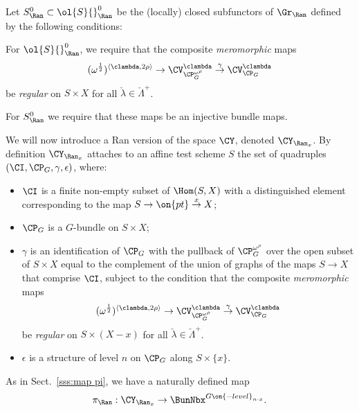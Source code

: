 \documentclass[9pt]{amsart}
\theoremstyle{definition}
\theoremstyle{remark}
\newcommand{\secref}[1]{Sect.~\ref{#1}}
\numberwithin{equation}{section}
\begin{document}
Let $S^0_\Ran\subset \ol{S}{}^0_\Ran$ be the (locally) closed subfunctors of $\Gr_\Ran$ defined by the following
conditions:

\medskip

For $\ol{S}{}^0_\Ran$, we require that the composite \emph{meromorphic}  maps
$$(\omega^{\frac{1}{2}})^{\langle \clambda,2\rho\rangle}\to \CV^{\clambda}_{\CP^{\omega^\rho}_G} \overset{\gamma}\to \CV^{\clambda}_{\CP_G}$$
be \emph{regular} on $S\times X$ for all $\check\lambda\in \check\Lambda^+$. 

\medskip

For $S^0_\Ran$ we require that these maps be an injective bundle maps. 

\sssec{}

We will now introduce a Ran version of the space $\CY$, denoted $\CY_{\Ran_x} $. By definition $\CY_{\Ran_x} $ 
attaches to an affine test scheme $S$ the set of quadruples $(\CI,\CP_G,\gamma,\epsilon)$, where: 

\begin{itemize}

\item $\CI$ is a finite non-empty subset of $\Hom(S,X)$ with a distinguished element
corresponding to the map $S\to \on{pt}\overset{x}\to X$;

\item $\CP_G$ is a $G$-bundle on $S\times X$; 

\item $\gamma$ is an identification of $\CP_G$ with the pullback of $\CP_G^{\omega^\rho}$
over the open subset of $S\times X$ equal to the complement of the union of graphs of the maps $S\to X$ that comprise $\CI$,
subject to the condition that the composite \emph{meromorphic}  maps
\begin{equation} \label{e:new Plucker}
(\omega^{\frac{1}{2}})^{\langle \clambda,2\rho\rangle}\to \CV^{\clambda}_{\CP^{\omega^\rho}_G} \overset{\gamma}\to \CV^{\clambda}_{\CP_G}
\end{equation}
be \emph{regular} on $S\times (X-x)$ for all $\check\lambda\in \check\Lambda^+$. 

\item $\epsilon$ is a structure of level $n$ on $\CP_G$ along $S\times \{x\}$.

\end{itemize} 

\sssec{}

As in \secref{sss:map pi}, we have a naturally defined map
$$\pi_\Ran:\CY_{\Ran_x}  \to \BunNbx^{G\on{-level}_{n\cdot x}}.$$
\end{document}

